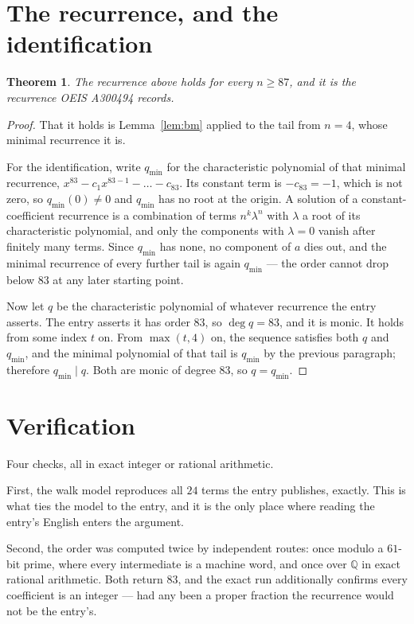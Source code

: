 \documentclass[11pt,a4paper]{article}
\theoremstyle{plain}
\newtheorem{theorem}{Theorem}
\theoremstyle{definition}
\begin{document}
\section{The recurrence, and the identification}

\begin{theorem}
The recurrence above holds for every $n\ge87$, and it is the recurrence OEIS A300494 records.
\end{theorem}

\begin{proof}
That it holds is Lemma~\ref{lem:bm} applied to the tail from $n=4$, whose minimal
recurrence it is.

For the identification, write $q_{\min}$ for the characteristic polynomial of that minimal
recurrence, $x^{83}-c_1x^{83-1}-\dots-c_{83}$. Its constant term is
$-c_{83}=-1$, which is not zero, so $q_{\min}(0)\neq0$ and $q_{\min}$ has no
root at the origin. A solution of a constant-coefficient recurrence is a combination of terms
$n^{k}\lambda^{n}$ with $\lambda$ a root of its characteristic polynomial, and only the
components with $\lambda=0$ vanish after finitely many terms. Since $q_{\min}$ has none, no
component of $a$ dies out, and the minimal recurrence of every further tail is again
$q_{\min}$ --- the order cannot drop below $83$ at any later starting point.

Now let $q$ be the characteristic polynomial of whatever recurrence the entry asserts. The
entry asserts it has order $83$, so $\deg q=83$, and it is monic. It holds from some
index $t$ on. From $\max(t,4)$ on, the sequence satisfies both $q$ and $q_{\min}$, and
the minimal polynomial of that tail is $q_{\min}$ by the previous paragraph; therefore
$q_{\min}\mid q$. Both are monic of degree $83$, so $q=q_{\min}$.
\end{proof}

\section{Verification}

Four checks, all in exact integer or rational arithmetic.

First, the walk model reproduces all $24$ terms the entry publishes, exactly. This is
what ties the model to the entry, and it is the only place where reading the entry's English
enters the argument.

Second, the order was computed twice by independent routes: once modulo a $61$-bit prime, where
every intermediate is a machine word, and once over $\mathbb{Q}$ in exact rational arithmetic.
Both return $83$, and the exact run additionally confirms every coefficient is an integer
--- had any been a proper fraction the recurrence would not be the entry's.
\end{document}

